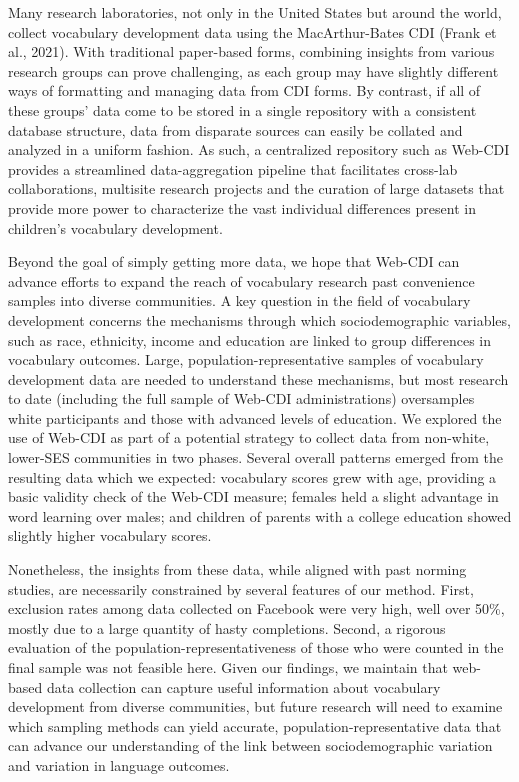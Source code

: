 \documentclass[
  english,
  man]{apa7}
\begin{document}
Many research laboratories, not only in the United States but around the world, collect vocabulary development data using the MacArthur-Bates CDI (Frank et al., 2021). With traditional paper-based forms, combining insights from various research groups can prove challenging, as each group may have slightly different ways of formatting and managing data from CDI forms. By contrast, if all of these groups' data come to be stored in a single repository with a consistent database structure, data from disparate sources can easily be collated and analyzed in a uniform fashion. As such, a centralized repository such as Web-CDI provides a streamlined data-aggregation pipeline that facilitates cross-lab collaborations, multisite research projects and the curation of large datasets that provide more power to characterize the vast individual differences present in children's vocabulary development.

Beyond the goal of simply getting more data, we hope that Web-CDI can advance efforts to expand the reach of vocabulary research past convenience samples into diverse communities. A key question in the field of vocabulary development concerns the mechanisms through which sociodemographic variables, such as race, ethnicity, income and education are linked to group differences in vocabulary outcomes. Large, population-representative samples of vocabulary development data are needed to understand these mechanisms, but most research to date (including the full sample of Web-CDI administrations) oversamples white participants and those with advanced levels of education. We explored the use of Web-CDI as part of a potential strategy to collect data from non-white, lower-SES communities in two phases. Several overall patterns emerged from the resulting data which we expected: vocabulary scores grew with age, providing a basic validity check of the Web-CDI measure; females held a slight advantage in word learning over males; and children of parents with a college education showed slightly higher vocabulary scores.

Nonetheless, the insights from these data, while aligned with past norming studies, are necessarily constrained by several features of our method. First, exclusion rates among data collected on Facebook were very high, well over 50\%, mostly due to a large quantity of hasty completions. Second, a rigorous evaluation of the population-representativeness of those who were counted in the final sample was not feasible here. Given our findings, we maintain that web-based data collection can capture useful information about vocabulary development from diverse communities, but future research will need to examine which sampling methods can yield accurate, population-representative data that can advance our understanding of the link between sociodemographic variation and variation in language outcomes.
\end{document}

